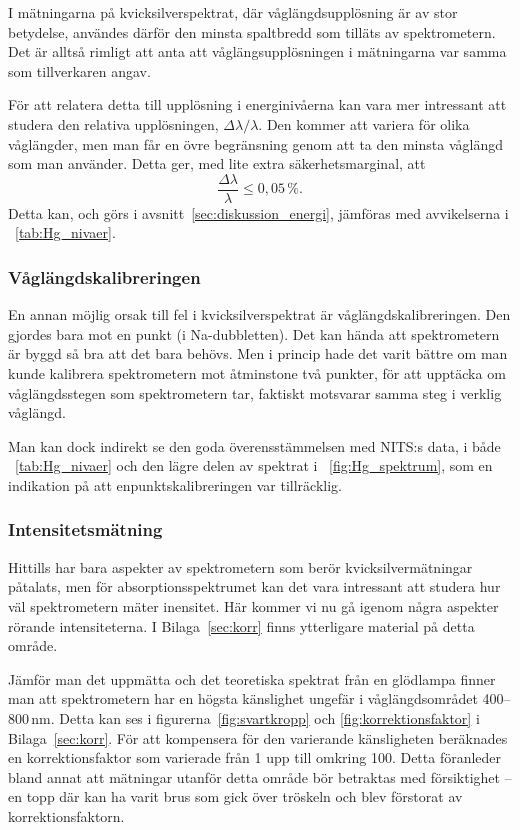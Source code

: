 \documentclass[11pt,a4paper]{article}
\newcommand{\figref}{\figurename~\ref}
\newcommand{\tabref}{\tablename~\ref} %
\begin{document}
I mätningarna på kvicksilverspektrat, där våglängdsupplösning är av
stor betydelse, användes därför den minsta spaltbredd som tilläts av
spektrometern. Det är alltså rimligt att anta att våglängsupplösningen
i mätningarna var samma som tillverkaren angav.

För att relatera detta till upplösning i energinivåerna\fotnotemark{}
kan vara mer intressant att studera den relativa upplösningen,
$\Delta\lambda/\lambda$. Den kommer att variera för olika våglängder,
men man får en övre begränsning genom att ta den minsta våglängd som
man använder. Detta ger, med lite extra säkerhetsmarginal, att 
\[ 
\frac{\Delta\lambda}{\lambda}\le 0,05\,\%. 
\]
Detta kan, och görs i avsnitt~\ref{sec:diskussion_energi}, jämföras
med avvikelserna i \tabref{tab:Hg_nivaer}.


\subsubsection{Våglängdskalibreringen}
En annan möjlig orsak till fel i kvicksilverspektrat är
våglängdskalibreringen. Den gjordes bara mot en punkt
(i Na-dubbletten). Det kan hända att spektrometern är byggd så bra att
det bara behövs. Men i princip hade det varit bättre om man kunde
kalibrera spektrometern mot åtminstone två punkter, för att upptäcka
om våglängdsstegen som spektrometern tar, faktiskt motsvarar samma
steg i verklig våglängd. 

Man kan dock indirekt se den goda överensstämmelsen med NITS:s data, i
både \tabref{tab:Hg_nivaer} och den lägre delen av spektrat i
\figref{fig:Hg_spektrum}, som en indikation på att enpunktskalibreringen
var tillräcklig.  

\subsubsection{Intensitetsmätning} 
Hittills har bara aspekter av spektrometern som berör
kvicksilvermätningar påtalats, men för absorptionsspektrumet kan det
vara intressant att studera hur väl spektrometern mäter inensitet. Här
kommer vi nu gå igenom några aspekter rörande intensiteterna. I
Bilaga~\ref{sec:korr} finns ytterligare material på detta område. 

Jämför man det uppmätta och det teoretiska spektrat
från en glödlampa finner man att spektrometern har en högsta
känslighet ungefär i våglängdsområdet 400--800\,nm. Detta kan ses i
figurerna~\ref{fig:svartkropp} och \ref{fig:korrektionsfaktor} i
Bilaga~\ref{sec:korr}. För att kompensera för den varierande
känsligheten beräknades en korrektionsfaktor som varierade från 1 upp
till omkring 100.
Detta föranleder bland annat att mätningar
utanför detta område bör betraktas med försiktighet -- en topp där kan
ha varit brus som gick över tröskeln och blev förstorat av
korrektionsfaktorn. 
\end{document}
